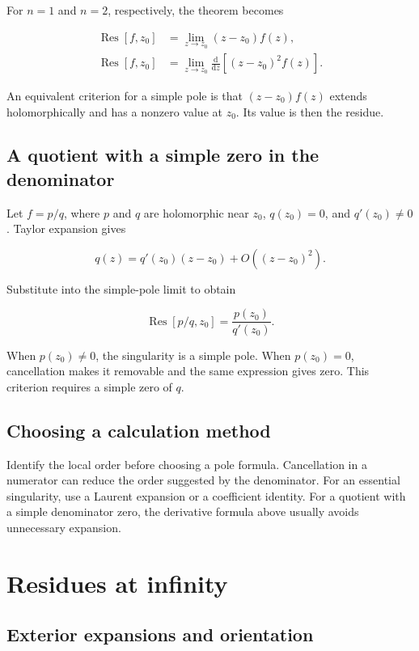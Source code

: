 \documentclass[11pt,a4paper]{article}
\theoremstyle{definition}
\theoremstyle{plain}
\begin{document}
For $n=1$ and $n=2$, respectively, the theorem becomes

\[
\begin{aligned}
\operatorname{Res}[f,z_0]&=\lim_{z\to z_0}(z-z_0)f(z),\\
\operatorname{Res}[f,z_0]&=\lim_{z\to z_0}
\frac{\mathrm{d}}{\mathrm{d}z}\left[(z-z_0)^2f(z)\right].
\end{aligned}
\]

An equivalent criterion for a simple pole is that $(z-z_0)f(z)$ extends holomorphically and has a nonzero value at $z_0$. Its value is then the residue.

\subsection{A quotient with a simple zero in the denominator}

Let $f=p/q$, where $p$ and $q$ are holomorphic near $z_0$, $q(z_0)=0$, and $q'(z_0)\ne0$. Taylor expansion gives

\[
q(z)=q'(z_0)(z-z_0)+O((z-z_0)^2).
\]

Substitute into the simple-pole limit to obtain

\[
\operatorname{Res}[p/q,z_0]=\frac{p(z_0)}{q'(z_0)}.
\]

When $p(z_0)\ne0$, the singularity is a simple pole. When $p(z_0)=0$, cancellation makes it removable and the same expression gives zero. This criterion requires a simple zero of $q$.

\subsection{Choosing a calculation method}

Identify the local order before choosing a pole formula. Cancellation in a numerator can reduce the order suggested by the denominator. For an essential singularity, use a Laurent expansion or a coefficient identity. For a quotient with a simple denominator zero, the derivative formula above usually avoids unnecessary expansion.

\section{Residues at infinity}

\subsection{Exterior expansions and orientation}
\end{document}
